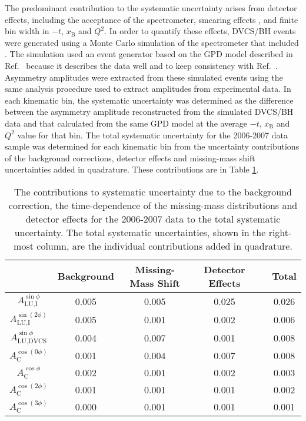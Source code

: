 The predominant contribution to the systematic uncertainty arises from detector
effects, including the acceptance of the spectrometer, smearing effects , and
finite bin width in $-t$, $x_{\textrm{B}}$ and $Q^{2}$. In order to quantify
these effects, DVCS/BH events were generated using a Monte Carlo simulation of
the spectrometer that included . The simulation used an event
generator based on the GPD model described in Ref.~\cite{Guz06} because it describes the data well and to keep consistency with Ref.~\cite{Air09}. Asymmetry amplitudes were extracted from these simulated events using the same analysis
procedure used to extract amplitudes from experimental data.  In each kinematic
bin, the systematic uncertainty was determined as the difference between the
asymmetry amplitude reconstructed from the simulated DVCS/BH data and that
calculated from the same GPD model at the average $-t$, $x_{\textrm{B}}$ and
$Q^{2}$ value for that bin.
The total systematic uncertainty for the 2006-2007 data sample was
determined for each kinematic bin from the uncertainty contributions of the
background corrections, detector effects and missing-mass shift
uncertainties added in quadrature. These contributions are  in Table
\ref{table_systematic_contributions_0607}.

\begin{table}[H]
 \begin{center}
\resizebox{16cm}{!} {
 \begin{tabular}{|c|c|c|c|c|c|}
  \hline
 & Background & Missing-Mass Shift & Detector Effects & & Total \\
  \hline
  \hline
  $A_{\textrm{LU,I}}^{\sin\phi}$ & 0.005 & 0.005 & 0.025 & & 0.026 \\
  \hline
  $A_{\textrm{LU,I}}^{\sin(2\phi)}$ & 0.005 & 0.001 & 0.002 & & 0.006 \\
  \hline
  \hline
  $A_{\textrm{LU,DVCS}}^{\sin\phi}$  & 0.004 & 0.007 & 0.001 & & 0.008 \\
  \hline
  \hline
  $A_{\textrm{C}}^{\cos(0\phi)}$ & 0.001 & 0.004 & 0.007 & & 0.008 \\
  \hline
  $A_{\textrm{C}}^{\cos\phi}$ & 0.002 & 0.001 & 0.002 & & 0.003 \\
  \hline
  $A_{\textrm{C}}^{\cos(2\phi)}$ & 0.001 & 0.001 & 0.001 & & 0.002 \\
  \hline
  $A_{\textrm{C}}^{\cos(3\phi)}$ & 0.000 & 0.001 & 0.001 & & 0.001 \\
  \hline
 \end{tabular}
}
  \caption{The contributions to systematic uncertainty due to the
background correction, the time-dependence of the missing-mass
distributions and detector effects for the 2006-2007 data to the total
systematic uncertainty. The total systematic uncertainties, shown in the
right-most column, are the individual contributions added in quadrature.}
  \label{table_systematic_contributions_0607}
\end{center}
\end{table}

